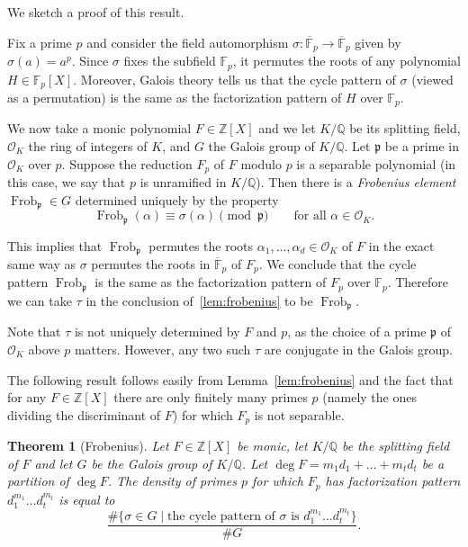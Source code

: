 \documentclass[11pt]{article}
\theoremstyle{plain}
\newtheorem{theorem}{Theorem}[section]
\theoremstyle{definition}
\theoremstyle{remark}
\numberwithin{equation}{section}
\newcommand{\longto}{\longrightarrow}
\newcommand{\ZZ}{\mathbb{Z}}
\newcommand{\FF}{\mathbb{F}}
\newcommand{\QQ}{\mathbb{Q}}
\newcommand{\Frob}{\operatorname{Frob}}
\begin{document}
We sketch a proof of this result.

Fix a prime $p$ and consider the field automorphism
$\sigma\colon\overline{\FF}_p\longto\overline{\FF}_p$ given by $\sigma(a)=a^p$.
Since $\sigma$ fixes the subfield $\FF_p$, it permutes the roots of any
polynomial $H\in\FF_p[X]$.  Moreover, Galois theory tells us that the cycle
pattern of $\sigma$ (viewed as a permutation) is the same as the factorization
pattern of $H$ over $\FF_p$. 

We now take a monic polynomial $F\in\ZZ[X]$ and we let $K/\QQ$ be its
splitting field, $\mathcal{O}_K$ the ring of integers of $K$, and $G$ the
Galois group of $K/\QQ$.  Let $\mathfrak{p}$ be a prime in $\mathcal{O}_K$
over $p$.  Suppose the reduction $F_p$ of $F$ modulo $p$ is a separable
polynomial (in this case, we say that $p$ is unramified in $K/\QQ$).  Then
there is a \emph{Frobenius element} $\Frob_{\mathfrak{p}}\in G$ determined
uniquely by the property
\begin{equation*}
  \Frob_{\mathfrak{p}}(\alpha)\equiv\sigma(\alpha)\pmod{\mathfrak{p}}\qquad
  \text{for all }\alpha\in\mathcal{O}_K.
\end{equation*}

This implies that $\Frob_{\mathfrak{p}}$ permutes the roots
$\alpha_1,\ldots,\alpha_d\in\mathcal{O}_K$ of $F$ in the exact same way as
$\sigma$ permutes the roots in $\overline{\FF}_p$ of $F_p$.  We conclude that
the cycle pattern $\Frob_{\mathfrak{p}}$ is the same as the factorization
pattern of $F_p$ over $\FF_p$.  Therefore we can take $\tau$ in the conclusion
of~\ref{lem:frobenius} to be $\Frob_{\mathfrak{p}}$.

Note that $\tau$ is not uniquely determined by $F$ and $p$, as the choice of a
prime $\mathfrak{p}$ of $\mathcal{O}_K$ above $p$ matters.  However, any two
such $\tau$ are conjugate in the Galois group.

The following result follows easily from Lemma~\ref{lem:frobenius} and the
fact that for any $F\in\ZZ[X]$ there are only finitely many primes $p$ (namely
the ones dividing the discriminant of $F$) for which $F_p$ is not separable.

\begin{theorem}[Frobenius]\label{thm:frobenius}
  Let $F\in\ZZ[X]$ be monic, let $K/\QQ$ be the splitting
  field of $F$ and let $G$ be the Galois group of $K/\QQ$.  
  Let $\deg F=m_1d_1+\ldots+m_td_t$ be a partition of $\deg F$.  
  The density of primes $p$ for which $F_p$ has factorization pattern
  $d_1^{m_1}\ldots d_t^{m_t}$ is equal to
  \begin{equation*}
    \frac{\#\{\sigma\in G\mid\text{the cycle pattern of $\sigma$ is 
    $d_1^{m_1}\ldots d_t^{m_t}$}\}
    }{\# G}.
  \end{equation*}
\end{theorem}
\end{document}
